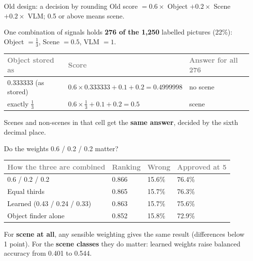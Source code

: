 \documentclass[aspectratio=169,11pt]{beamer}
\newcommand{\h}[1]{\textcolor{grey}{#1}}
\begin{document}
\begin{frame}{Old design: a decision by rounding}
Old score $= 0.6 \times$ Object $+ 0.2 \times$ Scene $+ 0.2 \times$ VLM; 0.5 or above means scene.

\vspace{0.4cm}
One combination of signals holds \textbf{276 of the 1,250} labelled pictures (22\%):\\
Object $= \tfrac13$, Scene $= 0.5$, VLM $= 1$.

\vspace{0.3cm}
\begin{tabular}{@{}L{4.2cm} L{4.6cm} L{2.6cm}@{}}
\toprule
\h{Object stored as} & \h{Score} & \h{Answer for all 276}\\
 (as stored) & $0.6 \times 0.333333 + 0.1 + 0.2 = 0.4999998$ & no scene\\
exactly $\tfrac13$ & $0.6 \times \tfrac13 + 0.1 + 0.2 = 0.5$ & scene\\
\bottomrule
\end{tabular}

\vspace{0.4cm}
Scenes and non-scenes in that cell get the \textbf{same answer}, decided by the sixth decimal place.
\end{frame}

\begin{frame}{Do the weights 0.6 / 0.2 / 0.2 matter?}
\begin{tabular}{@{}L{5.2cm} C{2.2cm} C{2.2cm} C{2.6cm}@{}}
\toprule
\h{How the three are combined} & \h{Ranking} & \h{Wrong} & \h{Approved at 5}\\
 / 0.2 / 0.2 & 0.866 & 15.6\% & 76.4\%\\
Equal thirds & 0.865 & 15.7\% & 76.3\%\\
Learned (0.43 / 0.24 / 0.33) & 0.863 & 15.7\% & 75.6\%\\
Object finder alone & 0.852 & 15.8\% & 72.9\%\\
\bottomrule
\end{tabular}

\vspace{0.4cm}
For \textbf{scene at all}, any sensible weighting gives the same result (differences below 1 point). For the \textbf{scene classes} they do matter: learned weights raise balanced accuracy from 0.401 to 0.544.
\end{frame}
\end{document}
